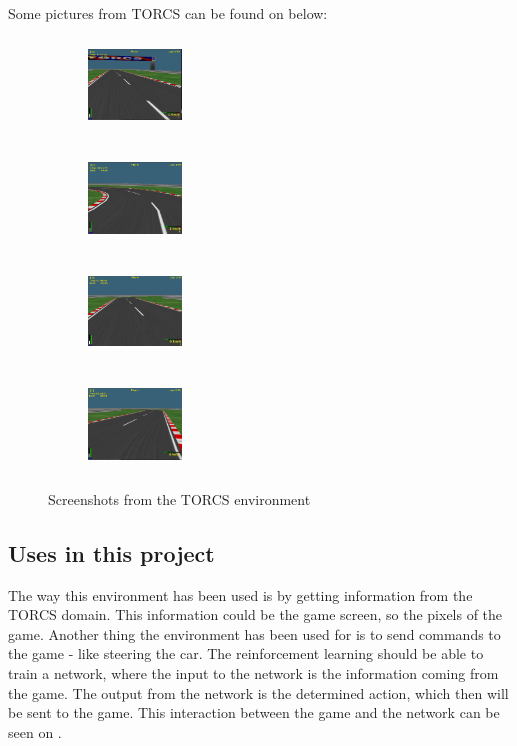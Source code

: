 Some pictures from TORCS can be found on  below:
\begin{figure} [H]
	\centering
	\begin{subfigure}{.20\textwidth}
		\centering
		\includegraphics[width=25mm, height=25mm]{Figures/Architecture/Torcs/torcs_2.png}
	\end{subfigure}
	\begin{subfigure}{.20\textwidth}
	\centering
	\includegraphics[width=25mm, height=25mm]{Figures/Architecture/Torcs/torcs_3.png}
    \end{subfigure}
	\begin{subfigure}{.20\textwidth}
	\centering
	\includegraphics[width=25mm, height=25mm]{Figures/Architecture/Torcs/torcs_4.png}
	\end{subfigure}
	\begin{subfigure}{.20\textwidth}
	\centering
	\includegraphics[width=25mm, height=25mm]{Figures/Architecture/Torcs/torcs_5.png}
	\end{subfigure}
	\caption{Screenshots from the TORCS environment}
	\label{fig:torcs_screenshots}
\end{figure}
      
\subsection{Uses in this project}      
The way this environment has been used is by getting information from the TORCS domain. This information could be the game screen, so the pixels of the game. Another thing the environment has been used for is to send commands to the game - like steering the car. 
The reinforcement learning should be able to train a network, where the input to the network is the information coming from the game. The output from the network is the determined action, which then will be sent to the game. This interaction between the game and the network can be seen on .   
 

